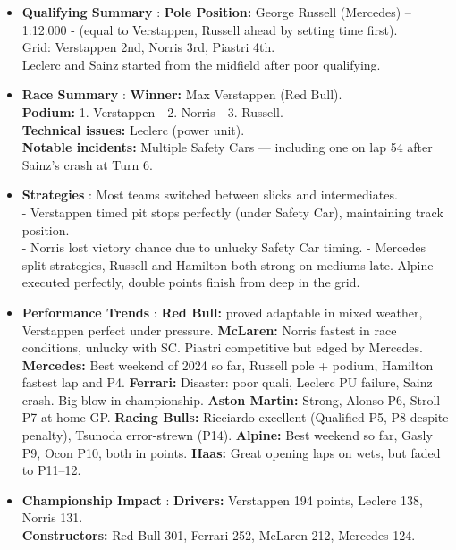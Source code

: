 \begin{itemize}
    \item \textbf{Qualifying Summary} : \textbf{Pole Position:} George Russell (Mercedes) – 1:12.000 - (equal to Verstappen, Russell ahead by setting time first). \\
    Grid: Verstappen 2nd, Norris 3rd, Piastri 4th.\\
    Leclerc and Sainz started from the midfield after poor qualifying.
    
    \item \textbf{Race Summary} : \textbf{Winner:} Max Verstappen (Red Bull).\\
    \textbf{Podium:} 1. Verstappen - 2. Norris - 3. Russell.\\
    \textbf{Technical issues:} Leclerc (power unit).\\
    \textbf{Notable incidents:} Multiple Safety Cars — including one on lap 54 after Sainz’s crash at Turn 6.
    
    \item \textbf{Strategies} : Most teams switched between slicks and intermediates.\\
    - Verstappen timed pit stops perfectly (under Safety Car), maintaining track position.\\ 
    - Norris lost victory chance due to unlucky Safety Car timing. 
    - Mercedes split strategies, Russell and Hamilton both strong on mediums late. 
    Alpine executed perfectly, double points finish from deep in the grid.
    
    \item \textbf{Performance Trends} : \textbf{Red Bull:} proved adaptable in mixed weather, Verstappen perfect under pressure.
    \textbf{McLaren:} Norris fastest in race conditions, unlucky with SC. Piastri competitive but edged by Mercedes. 
    \textbf{Mercedes:} Best weekend of 2024 so far, Russell pole + podium, Hamilton fastest lap and P4. 
    \textbf{Ferrari:} Disaster: poor quali, Leclerc PU failure, Sainz crash. Big blow in championship. 
    \textbf{Aston Martin:} Strong, Alonso P6, Stroll P7 at home GP. 
    \textbf{Racing Bulls:} Ricciardo excellent (Qualified P5, P8 despite penalty), Tsunoda error-strewn (P14). 
    \textbf{Alpine:} Best weekend so far, Gasly P9, Ocon P10, both in points. 
    \textbf{Haas:} Great opening laps on wets, but faded to P11–12.
    
    \item \textbf{Championship Impact} : \textbf{Drivers:} Verstappen 194 points, Leclerc 138, Norris 131.\\
    \textbf{Constructors:} Red Bull 301, Ferrari 252, McLaren 212, Mercedes 124.    
\end{itemize}

